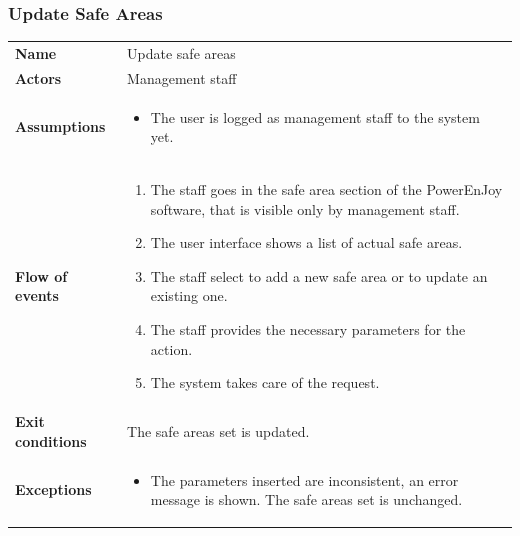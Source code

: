 \documentclass[english]{article}
\begin{document}
		\subsubsection{Update Safe Areas}
		\begin{center}
		\begin{tabular}{l||p{10cm}}
		\textbf{Name} 
			& Update safe areas\\ [8px]
		\textbf{Actors} 
			& Management staff\\ [8px]
		\textbf{Assumptions} 
			& \begin{itemize}
				\item The user is logged as management staff to the system yet.
			\end{itemize}\\
		\textbf{Flow of events}
			& \begin{enumerate}
	 			\item The staff goes in the safe area section of the PowerEnJoy software, that is visible only by management staff.
				\item The user interface shows a list of actual safe areas.
				\item The staff select to add a new safe area or to update an existing one.
				\item The staff provides the necessary parameters for the action.
				\item The system takes care of the request.
			\end{enumerate}\\ 
		\textbf{Exit conditions}
			& The safe areas set is updated.\\ [8px]
		\textbf{Exceptions}
			& \begin{itemize}
				\item The parameters inserted are inconsistent, an error message is shown. The safe areas set is unchanged.
			\end{itemize}
		\end{tabular}
		\end{center}
		\noindent
\end{document}
